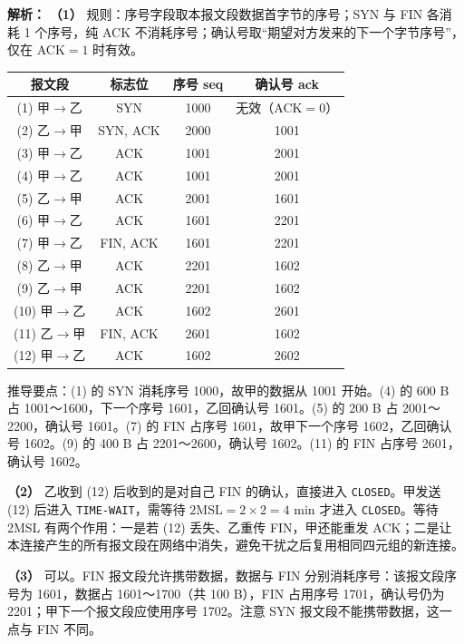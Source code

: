 \begin{enumerate}
\ifshowsolutions\par\noindent\textbf{解析：}
\textbf{（1）} 规则：序号字段取本报文段数据首字节的序号；SYN 与 FIN 各消耗 1 个序号，纯 ACK 不消耗序号；确认号取“期望对方发来的下一个字节序号”，仅在 ACK$=1$ 时有效。

\begin{center}
\small
\begin{tabular}{|c|c|c|c|}
\hline
报文段 & 标志位 & 序号 seq & 确认号 ack \\
\hline
(1) 甲$\to$乙 & SYN & 1000 & 无效（ACK$=0$）\\
(2) 乙$\to$甲 & SYN, ACK & 2000 & 1001 \\
(3) 甲$\to$乙 & ACK & 1001 & 2001 \\
(4) 甲$\to$乙 & ACK & 1001 & 2001 \\
(5) 乙$\to$甲 & ACK & 2001 & 1601 \\
(6) 甲$\to$乙 & ACK & 1601 & 2201 \\
(7) 甲$\to$乙 & FIN, ACK & 1601 & 2201 \\
(8) 乙$\to$甲 & ACK & 2201 & 1602 \\
(9) 乙$\to$甲 & ACK & 2201 & 1602 \\
(10) 甲$\to$乙 & ACK & 1602 & 2601 \\
(11) 乙$\to$甲 & FIN, ACK & 2601 & 1602 \\
(12) 甲$\to$乙 & ACK & 1602 & 2602 \\
\hline
\end{tabular}
\end{center}

推导要点：(1) 的 SYN 消耗序号 1000，故甲的数据从 1001 开始。(4) 的 600 B 占 1001～1600，下一个序号 1601，乙回确认号 1601。(5) 的 200 B 占 2001～2200，确认号 1601。(7) 的 FIN 占序号 1601，故甲下一个序号 1602，乙回确认号 1602。(9) 的 400 B 占 2201～2600，确认号 1602。(11) 的 FIN 占序号 2601，确认号 1602。

\textbf{（2）} 乙收到 (12) 后收到的是对自己 FIN 的确认，直接进入 \texttt{CLOSED}。甲发送 (12) 后进入 \texttt{TIME-WAIT}，需等待 $2\text{MSL}=2\times2=4$ min 才进入 \texttt{CLOSED}。等待 2MSL 有两个作用：一是若 (12) 丢失、乙重传 FIN，甲还能重发 ACK；二是让本连接产生的所有报文段在网络中消失，避免干扰之后复用相同四元组的新连接。

\textbf{（3）} 可以。FIN 报文段允许携带数据，数据与 FIN 分别消耗序号：该报文段序号为 1601，数据占 1601～1700（共 100 B），FIN 占用序号 1701，确认号仍为 2201；甲下一个报文段应使用序号 1702。注意 SYN 报文段不能携带数据，这一点与 FIN 不同。

\else \answerarea[10] \fi

\end{enumerate}
